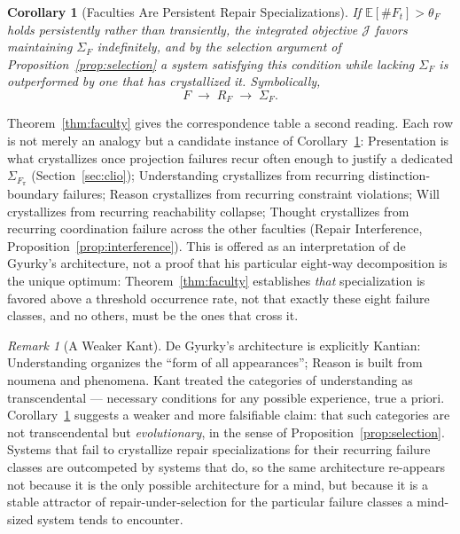 \documentclass[11pt]{article}
\theoremstyle{plain}
\newtheorem{corollary}[theorem]{Corollary}
\theoremstyle{definition}
\theoremstyle{remark}
\newtheorem{remark}[theorem]{Remark}
\begin{document}
\begin{corollary}[Faculties Are Persistent Repair Specializations]
\label{cor:faculty}
If $\mathbb{E}[\#F_t] > \theta_F$ holds persistently rather than transiently, the integrated objective $\mathcal{J}$ favors maintaining $\Sigma_F$ indefinitely, and by the selection argument of Proposition~\ref{prop:selection} a system satisfying this condition while lacking $\Sigma_F$ is outperformed by one that has crystallized it. Symbolically,
\[
F \;\to\; R_F \;\to\; \Sigma_F.
\]
\end{corollary}

Theorem~\ref{thm:faculty} gives the correspondence table a second reading. Each row is not merely an analogy but a candidate instance of Corollary~\ref{cor:faculty}: Presentation is what crystallizes once projection failures recur often enough to justify a dedicated $\Sigma_{F_\pi}$ (Section~\ref{sec:clio}); Understanding crystallizes from recurring distinction-boundary failures; Reason crystallizes from recurring constraint violations; Will crystallizes from recurring reachability collapse; Thought crystallizes from recurring coordination failure across the other faculties (Repair Interference, Proposition~\ref{prop:interference}). This is offered as an interpretation of de Gyurky's architecture, not a proof that his particular eight-way decomposition is the unique optimum: Theorem~\ref{thm:faculty} establishes \emph{that} specialization is favored above a threshold occurrence rate, not that exactly these eight failure classes, and no others, must be the ones that cross it.

\begin{remark}[A Weaker Kant]
De Gyurky's architecture is explicitly Kantian: Understanding organizes the ``form of all appearances''; Reason is built from noumena and phenomena. Kant treated the categories of understanding as transcendental --- necessary conditions for any possible experience, true a priori. Corollary~\ref{cor:faculty} suggests a weaker and more falsifiable claim: that such categories are not transcendental but \emph{evolutionary}, in the sense of Proposition~\ref{prop:selection}. Systems that fail to crystallize repair specializations for their recurring failure classes are outcompeted by systems that do, so the same architecture re-appears not because it is the only possible architecture for a mind, but because it is a stable attractor of repair-under-selection for the particular failure classes a mind-sized system tends to encounter.
\end{remark}
\end{document}
